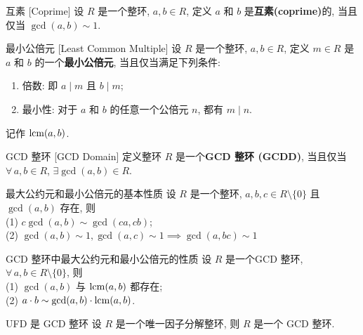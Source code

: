         \begin{dfn}
            {互素}
            [Coprime]
            设 \(R\) 是一个整环, \(a,b\in R\), 定义 \(a\) 和 \(b\) 是\textbf{互素(coprime)}的, 当且仅当 \(\gcd(a,b)\sim 1\).
        \end{dfn}

        \begin{dfn}
            [LCM]
            {最小公倍元}
            [Least Common Multiple]
            设 \(R\) 是一个整环, \(a,b\in R\), 定义 \(m\in R\) 是 \(a\) 和 \(b\) 的一个\textbf{最小公倍元}, 当且仅当满足下列条件:
            \begin{enumerate}
                \item 倍数: 即 \(a\mid m\) 且 \(b\mid m\);
                \item 最小性: 对于 \(a\) 和 \(b\) 的任意一个公倍元 \(n\), 都有 \(m\mid n\).
            \end{enumerate}
            记作 \(\operatorname{lcm}(a,b)\).
        \end{dfn}

        \begin{dfn}
            {GCD 整环}
            [GCD Domain]
            定义整环 \(R\) 是一个\textbf{GCD 整环 (GCDD)}, 当且仅当 \(\forall\, a,b\in R\), \(\exists \gcd(a,b)\in R\).
        \end{dfn}

        \begin{ppt}
            {最大公约元和最小公倍元的基本性质}
            设 \(R\) 是一个整环, \(a,b,c\in R\setminus\{0\}\) 且 \(\gcd(a,b)\) 存在, 则\\
            (1) \(c\gcd(a,b)\sim \gcd(ca,cb)\);\\
            (2) \(\gcd(a,b)\sim 1, \gcd(a,c)\sim 1\implies \gcd(a,bc)\sim 1\)
        \end{ppt}

        \begin{ppt}
            {GCD 整环中最大公约元和最小公倍元的性质}
            设 \(R\) 是一个GCD 整环, \(\forall\, a,b\in R\setminus\{0\}\), 则\\
            (1) \(\gcd(a,b)\) 与 \(\operatorname{lcm}(a,b)\) 都存在;\\
            (2) \(a\cdot b\sim \gcd(a,b)\cdot \operatorname{lcm}(a,b)\).
        \end{ppt}

        \begin{ppt}
            {UFD 是 GCD 整环}
            设 \(R\) 是一个唯一因子分解整环, 则 \(R\) 是一个 GCD 整环.
        \end{ppt}

